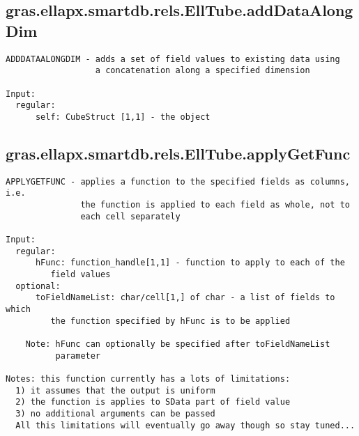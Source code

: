 \subsection{\texorpdfstring{gras.ellapx.smartdb.rels.EllTube.addDataAlongDim}{addDataAlongDim}}\label{method:gras.ellapx.smartdb.rels.EllTube.addDataAlongDim}
\begin{verbatim}
ADDDATAALONGDIM - adds a set of field values to existing data using
                  a concatenation along a specified dimension

Input:
  regular:
      self: CubeStruct [1,1] - the object
\end{verbatim}
\subsection{\texorpdfstring{gras.ellapx.smartdb.rels.EllTube.applyGetFunc}{applyGetFunc}}\label{method:gras.ellapx.smartdb.rels.EllTube.applyGetFunc}
\begin{verbatim}
APPLYGETFUNC - applies a function to the specified fields as columns, i.e.
               the function is applied to each field as whole, not to
               each cell separately

Input:
  regular:
      hFunc: function_handle[1,1] - function to apply to each of the
         field values
  optional:
      toFieldNameList: char/cell[1,] of char - a list of fields to which
         the function specified by hFunc is to be applied

    Note: hFunc can optionally be specified after toFieldNameList
          parameter

Notes: this function currently has a lots of limitations:
  1) it assumes that the output is uniform
  2) the function is applies to SData part of field value
  3) no additional arguments can be passed
  All this limitations will eventually go away though so stay tuned...
\end{verbatim}

